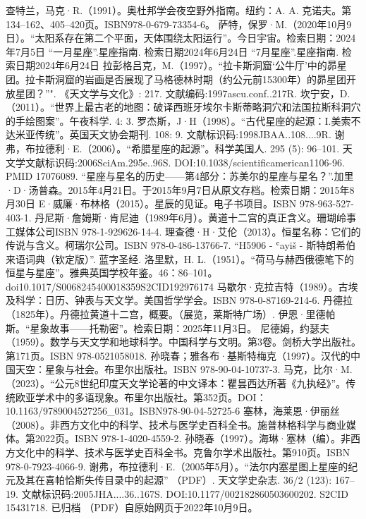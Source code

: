 \begin{itemize}
\begin{enumerate}
 查特兰，马克·R.（1991）。奥杜邦学会夜空野外指南。纽约：A. A. 克诺夫。第134–162、405–420页。ISBN978-0-679-73354-6。
 萨特，保罗·M.（2020年10月9日）。“太阳系存在第二个平面，天体围绕太阳运行”。今日宇宙。检索日期：2024年7月5日
 “一月星座”.星座指南. 检索日期2024年6月24日
 “7月星座”.星座指南. 检索日期2024年6月24日
 拉彭格吕克，M.（1997）。“拉卡斯洞窟‘公牛厅’中的昴星团。拉卡斯洞窟的岩画是否展现了马格德林时期（约公元前15300年）的昴星团开放星团？”". 《天文学与文化》: 217. 文献编码:1997ascu.conf..217R.
 坎宁安，D.（2011）。“世界上最古老的地图：破译西班牙埃尔卡斯蒂略洞穴和法国拉斯科洞穴的手绘图案”。午夜科学. 4: 3.
 罗杰斯，J·H（1998）。“古代星座的起源：I.美索不达米亚传统”。英国天文协会期刊. 108: 9. 文献标识码:1998JBAA..108....9R.
 谢弗，布拉德利·E.（2006）。“希腊星座的起源”。科学美国人. 295 (5): 96–101. 天文学文献标识码:2006SciAm.295e..96S. DOI:10.1038/scientificamerican1106-96. PMID 17076089.
 “星座与星名的历史——第4部分：苏美尔的星座与星名？”.加里·D·汤普森。2015年4月21日。于2015年9月7日从原文存档。检索日期：2015年8月30日
 E·威廉·布林格（2015）。星辰的见证。电子书项目。ISBN 978-963-527-403-1.
 丹尼斯·詹姆斯·肯尼迪（1989年6月）。黄道十二宫的真正含义。珊瑚岭事工媒体公司ISBN 978-1-929626-14-4.
 理查德·H·艾伦（2013）。恒星名称：它们的传说与含义。柯瑞尔公司。ISBN 978-0-486-13766-7.
 “H5906 - ʿayiš - 斯特朗希伯来语词典（钦定版）”. 蓝字圣经.
 洛里默，H. L.（1951）。“荷马与赫西俄德笔下的恒星与星座”。雅典英国学校年鉴。46：86–101。doi10.1017/S0068245400018359S2CID192976174
 马歇尔·克拉吉特（1989）。古埃及科学：日历、钟表与天文学。美国哲学学会。ISBN 978-0-87169-214-6.
 丹德拉（1825年）。丹德拉黄道十二宫，概要。（展览，莱斯特广场）.
 伊恩·里德帕斯。“星象故事——托勒密”。检索日期：2025年11月3日。
 尼德姆，约瑟夫（1959）。数学与天文学和地球科学。中国科学与文明。第3卷。剑桥大学出版社。第171页。ISBN 978-0521058018.
 孙晓春；雅各布·基斯特梅克（1997）。汉代的中国天空：星象与社会。布里尔出版社。ISBN 978-90-04-10737-3.
 马克，比尔·M.（2023）。“公元8世纪印度天文学论著的中文译本：瞿昙西达所著《九执经》”。传统欧亚学术中的多语现象。布里尔出版社。第352页。DOI：10.1163/9789004527256_031。ISBN978-90-04-52725-6
 塞林，海莱恩·伊丽丝（2008）。非西方文化中的科学、技术与医学史百科全书。施普林格科学与商业媒体。第2022页。ISBN 978-1-4020-4559-2.
 孙晓春（1997）。海琳·塞林（编）。非西方文化中的科学、技术与医学史百科全书。克鲁尔学术出版社。第910页。ISBN 978-0-7923-4066-9.
 谢弗，布拉德利·E.（2005年5月）。“法尔内塞星图上星座的纪元及其在喜帕恰斯失传目录中的起源” （PDF）. 天文学史杂志. 36/2 (123): 167–19. 文献标识码:2005JHA....36..167S. DOI:10.1177/002182860503600202. S2CID 15431718. 已归档 （PDF）自原始网页于2022年10月9日。

\end{enumerate}
\end{itemize}
